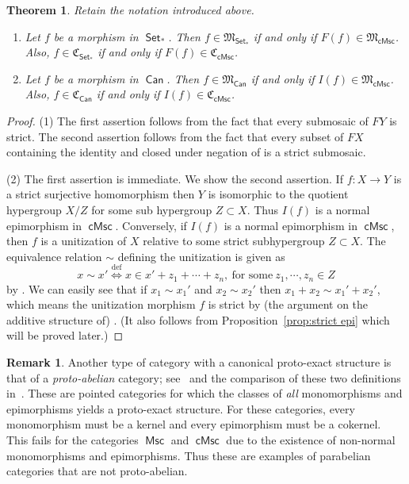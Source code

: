 \documentclass[reqno]{amsart}
\newcommand{\cat}[1]{\ensuremath{\mathsf{#1}}}
\DeclareMathOperator{\Set}{\cat{Set}}
\DeclareMathOperator{\Msc}{\cat{Msc}}
\DeclareMathOperator{\cMsc}{\cat{cMsc}}
\DeclareMathOperator{\Can}{\cat{Can}}
\numberwithin{equation}{section}
\theoremstyle{plain}
\newtheorem{theorem}[equation]{Theorem}
\theoremstyle{definition}
\newtheorem{remark}[equation]{Remark}
\begin{document}
\begin{theorem}
Retain the notation introduced above.
\begin{enumerate}
\item Let $f$ be a morphism in $\Set_*$. Then $f\in\mathfrak{M}_{\Set_*}$ if and only if $F(f)\in\mathfrak{M}_{\cMsc}$. Also, $f\in\mathfrak{C}_{\Set_*}$ if and only if $F(f)\in\mathfrak{C}_{\cMsc}$. 
\item Let $f$ be a morphism in $\Can$. Then $f\in\mathfrak{M}_{\Can}$ if and only if $I(f)\in\mathfrak{M}_{\cMsc}$. Also, $f\in\mathfrak{C}_{\Can}$ if and only if $I(f)\in\mathfrak{C}_{\cMsc}$. 
\end{enumerate}
\end{theorem}
\begin{proof}
(1) The first assertion follows from the fact that every submosaic of $FY$ is strict. The second assertion follows from the fact that every subset of $FX$ containing the identity and closed under negation of is a strict submosaic.

(2) The first assertion is immediate. We show the second assertion. If $f:X\rightarrow Y$ is a strict surjective homomorphism then $Y$ is isomorphic to the quotient hypergroup $X/Z$ for some sub hypergroup $Z\subset X$. Thus $I(f)$ is a normal epimorphism in $\cMsc$. Conversely, if $I(f)$ is a normal epimorphism in $\cMsc$, then $f$ is a unitization of $X$ relative to some strict subhypergroup $Z\subset X$. The equivalence relation $\sim$ defining the unitization is given as 
$$x\sim x' \overset{\mathrm{def}}{\Longleftrightarrow} x\in x'+z_1+\cdots+z_n,\ \text{for some}\ z_1, \cdots, z_n\in Z$$
by \cite[Lemma 3.10]{NakamuraReyes}. We can easily see that if $x_1\sim x_1'$ and $x_2\sim x_2'$ then $x_1+x_2\sim x_1'+x_2'$, which means the unitization morphism $f$ is strict by (the argument on the additive structure of) \cite[Proposition 3.13]{Jun:geometry}. (It also follows from Proposition~\ref{prop:strict epi} which will be proved later.)
\end{proof}


\begin{remark}\label{rem:proto-abelian}
Another type of category with a canonical proto-exact structure is that of a \emph{proto-abelian} category; see~\cite{Andre, Dyckerhoff} and the comparison of these two definitions in~\cite[Remark~1.13]{Mozgovoy}. These are pointed categories for which the classes of \emph{all} monomorphisms and epimorphisms yields a proto-exact structure. For these categories, every monomorphism must be a kernel and every epimorphism must be a cokernel. This fails for the categories $\Msc$ and $\cMsc$ due to the existence of non-normal monomorphisms and epimorphisms. Thus these are examples of parabelian categories that are not proto-abelian. 
\end{remark}
\end{document}
